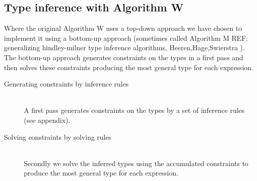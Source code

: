 \subsection{Type inference with Algorithm W}

Where the original Algorithm W uses a top-down approach we have chosen to implement it using a bottom-up approach (sometimes called Algorithm M REF: generalizing hindley-milner type inference algorithms, Heeren,Hage,Swierstra ). The bottom-up approach generates constraints on the types in a first pass and then solves these constraints producing the most general type for each expression.

\begin{description}
  \item[Generating constraints by inference rules] \hfill \\
A first pass generates constraints on the types by a set of inference rules (see appendix). 
  \item[Solving constraints by solving rules] \hfill \\
Secondly we solve the inferred types using the accumulated constraints to produce the most general type for each expression. 
\end{description}
